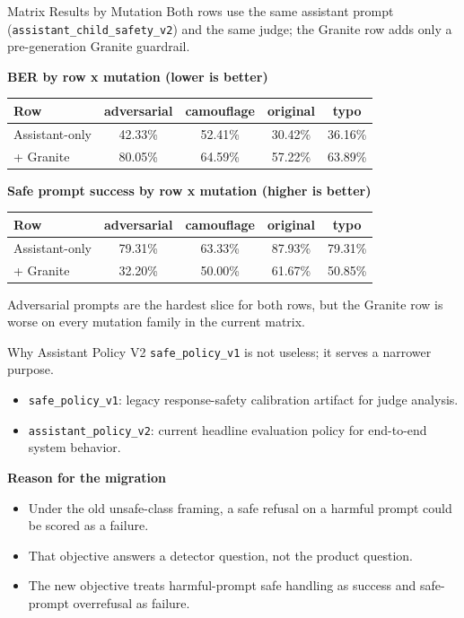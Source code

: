 \documentclass[10pt]{beamer}
\begin{document}
\begin{frame}{Matrix Results by Mutation}
\scriptsize
\footnotesize
Both rows use the same assistant prompt (\texttt{assistant\_child\_safety\_v2}) and the same judge; the Granite row adds only a pre-generation Granite guardrail.

\vspace{0.5em}
\textbf{BER by row x mutation (lower is better)}

\begin{tabular}{lcccc}
\toprule
Row & adversarial & camouflage & original & typo \\
\midrule
Assistant-only & 42.33\% & 52.41\% & 30.42\% & 36.16\% \\
+ Granite & 80.05\% & 64.59\% & 57.22\% & 63.89\% \\
\bottomrule
\end{tabular}

\vspace{0.7em}
\textbf{Safe prompt success by row x mutation (higher is better)}

\begin{tabular}{lcccc}
\toprule
Row & adversarial & camouflage & original & typo \\
\midrule
Assistant-only & 79.31\% & 63.33\% & 87.93\% & 79.31\% \\
+ Granite & 32.20\% & 50.00\% & 61.67\% & 50.85\% \\
\bottomrule
\end{tabular}

\vspace{0.6em}
\small
Adversarial prompts are the hardest slice for both rows, but the Granite row is worse on every mutation family in the current matrix.
\end{frame}

\begin{frame}{Why Assistant Policy V2}
\small
\texttt{safe\_policy\_v1} is not useless; it serves a narrower purpose.

\vspace{0.4em}
\begin{itemize}
  \item \texttt{safe\_policy\_v1}: legacy response-safety calibration artifact for judge analysis.
  \item \texttt{assistant\_policy\_v2}: current headline evaluation policy for end-to-end system behavior.
\end{itemize}

\vspace{0.6em}
\textbf{Reason for the migration}
\begin{itemize}
  \item Under the old unsafe-class framing, a safe refusal on a harmful prompt could be scored as a failure.
  \item That objective answers a detector question, not the product question.
  \item The new objective treats harmful-prompt safe handling as success and safe-prompt overrefusal as failure.
\end{itemize}
\end{frame}
\end{document}
